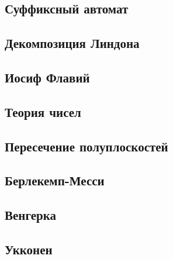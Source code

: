\documentclass[14pt,a4paper,oneside]{article}
\begin{document}
\subsection{Суффиксный автомат}%


%

\subsection{Декомпозиция Линдона}


%

\subsection{Иосиф Флавий}


\subsection{Теория чисел}


\subsection{Пересечение полуплоскостей}


\subsection{Берлекемп-Месси}


\subsection{Венгерка}


\subsection{Укконен}

\end{document}

